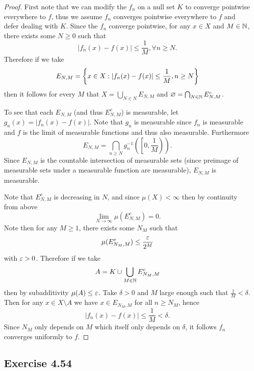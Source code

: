 \documentclass[hw_all.tex]{subfiles}
\begin{document}
\begin{proof}
    First note that we can modify the $f_n$ on a null set $K$ to converge pointwise everywhere to $f$, thus we assume $f_n$ converges pointwise everywhere to $f$ and defer dealing with $K$. Since the $f_n$ converge pointwise, for any $x \in X$ and $M \in \mathbb{N}$, there exists some $N \geq 0$ such that
    \[
        |f_n(x) - f(x)| \leq \frac{1}{M}, \forall n \geq N
    .\]
    Therefore if we take
    \[
        E_{N,M} = \qty{x \in X : |f_n(x) - f(x)| \leq \frac{1}{M}, n \geq N}
    \]
    then it follows for every $M$ that $X = \bigcup_{N \in N} E_{N, M}$ and $\varnothing = \bigcap_{N \in \mathbb{N}} E_{N,M}^c$. 
    
    To see that each $E_{N,M}$ (and thus $E_{N,M}^c$) is measurable, let $g_n(x) = |f_n(x) - f(x)|$. Note that $g_n$ is measurable since $f_n$ is measurable and $f$ is the limit of measurable functions and thus also measurable. Furthermore
    \[
        E_{N,M} = \bigcap_{n \geq N} g_n^{-1}\left(\left[0,\frac{1}{M}\right)\right)
    .\]
    Since $E_{N,M}$ is the countable intersection of measurable sets (since preimage of measurable sets under a measurable function are measurable), $E_{N,M}$ is measurable.

    Note that $E_{N,M}^c$ is decreasing in $N$, and since $\mu(X) < \infty$ then by continuity from above
    \[
        \lim_{N \to \infty} \mu(E_{N,M}^c) = 0
    .\]
    Note then for any $M \geq 1$, there exists some $N_M$ such that
    \[
        \mu(E_{N_M, M}^c) \leq \frac{\varepsilon}{2^M}
    \]
    with $\varepsilon > 0$. Therefore if we take
    \[
        A = K \cup \bigcup_{M \in \mathbb{N}} E_{N_M, M}^c
    \]
    then by subadditivity $\mu(A) \leq \varepsilon$. Take $\delta > 0$ and $M$ large enough such that $\frac{1}{M} < \delta$. Then for any $x \in X \setminus A$ we have $x \in E_{N_M, M}$ for all $n \geq N_M$, hence
    \[
        |f_n(x) - f(x)| \leq \frac{1}{M} < \delta
    .\]
    Since $N_M$ only depends on $M$ which itself only depends on $\delta$, it follows $f_n$ converges uniformly to $f$.
\end{proof}

\subsection{Exercise 4.54}
\end{document}
